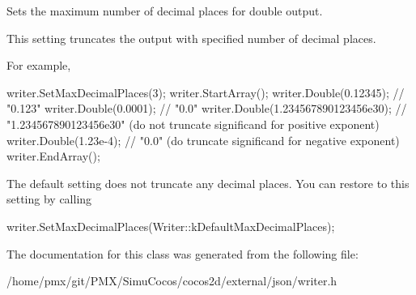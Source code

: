 Sets the maximum number of decimal places for double output. 

This setting truncates the output with specified number of decimal places.

For example,


\begin{DoxyCode}
writer.SetMaxDecimalPlaces(3);
writer.StartArray();
writer.Double(0.12345);                 \textcolor{comment}{// "0.123"}
writer.Double(0.0001);                  \textcolor{comment}{// "0.0"}
writer.Double(1.234567890123456e30);    \textcolor{comment}{// "1.234567890123456e30" (do not truncate significand for positive
       exponent)}
writer.Double(1.23e-4);                 \textcolor{comment}{// "0.0"                  (do truncate significand for negative
       exponent)}
writer.EndArray();
\end{DoxyCode}


The default setting does not truncate any decimal places. You can restore to this setting by calling 
\begin{DoxyCode}
writer.SetMaxDecimalPlaces(Writer::kDefaultMaxDecimalPlaces);
\end{DoxyCode}
 

The documentation for this class was generated from the following file\+:\begin{DoxyCompactItemize}
\item 
/home/pmx/git/\+P\+M\+X/\+Simu\+Cocos/cocos2d/external/json/writer.\+h\end{DoxyCompactItemize}
